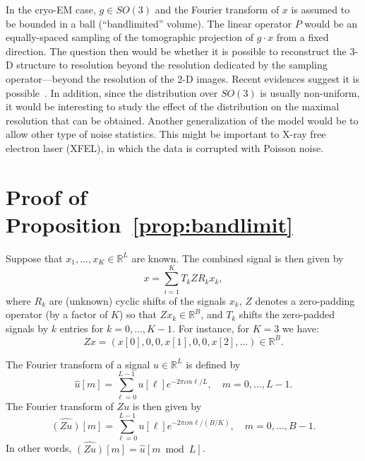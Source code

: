 \documentclass[english,12pt]{article}
\newcommand{\I}{\iota}
\newcommand{\R}{\mathbb{R}}
\numberwithin{equation}{section}
\numberwithin{thm}{section} %
\begin{document}
In the cryo-EM case, $g\in SO(3)$ and the Fourier transform of $x$ is assumed to be bounded in a ball (``bandlimited'' volume). The linear operator $P$ would be an equally-spaced sampling of the tomographic projection of $g\cdot x$ from a fixed direction. The question then would be whether it is possible to reconstruct the 3-D structure to resolution beyond the resolution dedicated by the sampling operator---beyond the resolution of the 2-D images. Recent evidences suggest it is possible~\cite{chen2018single}. In addition, since the distribution over $SO(3)$ is usually non-uniform, it would be interesting to study the effect of the distribution on the maximal resolution that can be obtained. Another generalization of the model would be to allow other type of noise statistics. This might be important to X-ray free electron laser (XFEL), in which the data is corrupted with Poisson noise.
 
	




\appendix

\section{Proof of Proposition~\ref{prop:bandlimit}} \label{sec:proof_bandlimit}
Suppose that $x_1,\ldots,x_K\in\R^L$ are known.
The combined signal is then given by 
\begin{equation}
x = \sum_{i=1}^K T_kZR_kx_k,
\end{equation}
where $R_k$ are (unknown) cyclic shifts of the signals $x_k$, $Z$ denotes a zero-padding operator (by a factor of $K$) so that $Zx_k\in\mathbb{R}^B$, and $T_k$ shifts the zero-padded signals by $k$ entries for $k=0,\ldots, K-1$. 
For instance, for $K=3$ we have: 
\begin{equation}
Zx = (x[0],0,0,x[1],0,0,x[2],...)\in\mathbb{R}^B.
\end{equation}

The Fourier transform of a signal $u\in\mathbb{R}^{L}$ is defined by 
\begin{equation}
\hat{u}[m]=\sum_{\ell=0}^{L-1}u[\ell]e^{-2\pi\I m\ell /L}, \quad m=0,\ldots,L-1. 
\end{equation}
The Fourier transform of $Zu$ is then given by 
\begin{equation}
\widehat{(Zu)}[m] = \sum_{\ell=0}^{L-1}u[\ell]e^{-2\pi\I m\ell /(B/K)}, \quad m=0,\ldots,B-1.
\end{equation}
In other words, $\widehat{(Zu)}[m] = \hat{u}[m\bmod L]$.
\end{document}
